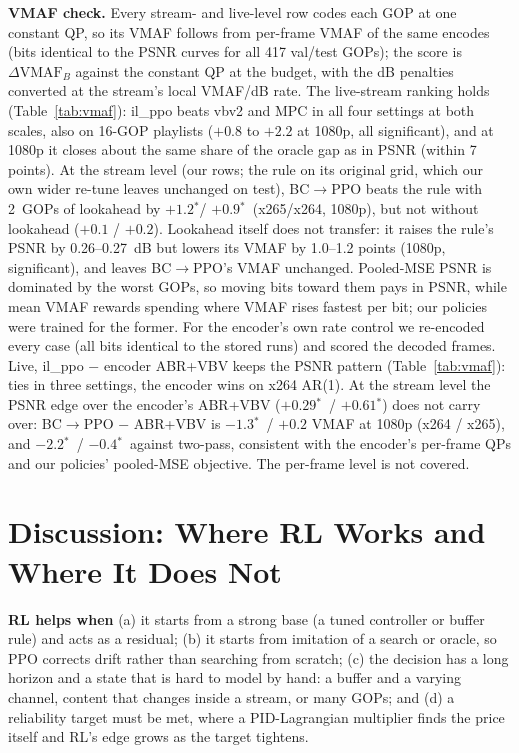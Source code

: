\documentclass[conference]{IEEEtran}
\newcommand{\sig}{$^{*}$}
\begin{document}
\textbf{VMAF check.} Every stream- and live-level row codes each GOP at one constant QP, so its VMAF follows from per-frame VMAF of the same encodes (bits identical to the PSNR curves for all 417 val/test GOPs); the score is $\Delta\text{VMAF}_B$ against the constant QP at the budget, with the dB penalties converted at the stream's local VMAF/dB rate. The live-stream ranking holds (Table~\ref{tab:vmaf}): il\_ppo beats vbv2 and MPC in all four settings at both scales, also on 16-GOP playlists ($+0.8$ to $+2.2$ at 1080p, all significant), and at 1080p it closes about the same share of the oracle gap as in PSNR (within 7 points). At the stream level (our rows; the rule on its original grid, which our own wider re-tune leaves unchanged on test), BC$\to$PPO beats the rule with 2~GOPs of lookahead by $+1.2$\sig / $+0.9$\sig\ (x265/x264, 1080p), but not without lookahead ($+0.1$ / $+0.2$). Lookahead itself does not transfer: it raises the rule's PSNR by 0.26--0.27~dB but lowers its VMAF by 1.0--1.2 points (1080p, significant), and leaves BC$\to$PPO's VMAF unchanged. Pooled-MSE PSNR is dominated by the worst GOPs, so moving bits toward them pays in PSNR, while mean VMAF rewards spending where VMAF rises fastest per bit; our policies were trained for the former. For the encoder's own rate control we re-encoded every case (all bits identical to the stored runs) and scored the decoded frames. Live, il\_ppo $-$ encoder ABR+VBV keeps the PSNR pattern (Table~\ref{tab:vmaf}): ties in three settings, the encoder wins on x264 AR(1). At the stream level the PSNR edge over the encoder's ABR+VBV ($+0.29$\sig\ / $+0.61$\sig) does not carry over: BC$\to$PPO $-$ ABR+VBV is $-1.3$\sig\ / $+0.2$ VMAF at 1080p (x264 / x265), and $-2.2$\sig\ / $-0.4$\sig\ against two-pass, consistent with the encoder's per-frame QPs and our policies' pooled-MSE objective. The per-frame level is not covered.

\section{Discussion: Where RL Works and Where It Does Not}
\textbf{RL helps when} (a) it starts from a strong base (a tuned controller or buffer rule) and acts as a residual; (b) it starts from imitation of a search or oracle, so PPO corrects drift rather than searching from scratch; (c) the decision has a long horizon and a state that is hard to model by hand: a buffer and a varying channel, content that changes inside a stream, or many GOPs; and (d) a reliability target must be met, where a PID-Lagrangian multiplier finds the price itself and RL's edge grows as the target tightens.
\end{document}
